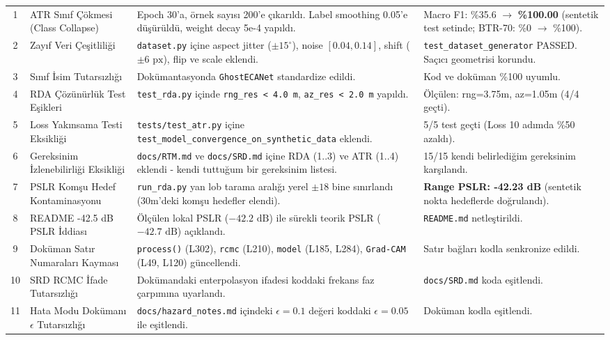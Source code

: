 \documentclass[11pt,a4paper]{article}
\begin{document}
\begin{xltabular}{\textwidth}{c p{3.4cm} p{5.2cm} X}
1 & ATR Sınıf Çökmesi (Class Collapse) & Epoch 30'a, örnek sayısı 200'e çıkarıldı. Label smoothing 0.05'e düşürüldü, weight decay 5e-4 yapıldı. & Macro F1: \%35.6 $\rightarrow$ \textbf{\%100.00} (sentetik test setinde; BTR-70: \%0 $\rightarrow$ \%100). \\
2 & Zayıf Veri Çeşitliliği & \texttt{dataset.py} içine aspect jitter ($\pm 15^\circ$), noise $[0.04, 0.14]$, shift ($\pm 6\text{ px}$), flip ve scale eklendi. & \texttt{test\_dataset\_}\allowbreak\texttt{generator} PASSED. Saçıcı geometrisi korundu. \\
3 & Sınıf İsim Tutarsızlığı & Dokümantasyonda \texttt{GhostECANet} standardize edildi. & Kod ve doküman \%100 uyumlu. \\
4 & RDA Çözünürlük Test Eşikleri & \texttt{test\_rda.py} içinde \texttt{rng\_res < 4.0 m}, \texttt{az\_res < 2.0 m} yapıldı. & Ölçülen: rng=3.75m, az=1.05m (4/4 geçti). \\
5 & Loss Yakınsama Testi Eksikliği & \texttt{tests/test\_atr.py} içine \texttt{test\_model\_}\allowbreak\texttt{convergence\_}\allowbreak\texttt{on\_synthetic\_data} eklendi. & 5/5 test geçti (Loss 10 adımda \%50 azaldı). \\
6 & Gereksinim İzlenebilirliği Eksikliği & \texttt{docs/RTM.md} ve \texttt{docs/SRD.md} içine RDA (1..3) ve ATR (1..4) eklendi - kendi tuttuğum bir gereksinim listesi. & 15/15 kendi belirlediğim gereksinim karşılandı. \\
7 & PSLR Komşu Hedef Kontaminasyonu & \texttt{run\_rda.py} yan lob tarama aralığı yerel $\pm 18$ bine sınırlandı (30m'deki komşu hedefler elendi). & \textbf{Range PSLR: -42.23 dB} (sentetik nokta hedeflerde doğrulandı). \\
8 & README -42.5 dB PSLR İddiası & Ölçülen lokal PSLR ($-42.2\text{ dB}$) ile sürekli teorik PSLR ($-42.7\text{ dB}$) açıklandı. & \texttt{README.md} netleştirildi. \\
9 & Doküman Satır Numaraları Kayması & \texttt{process()} (L302), \texttt{rcmc} (L210), \texttt{model} (L185, L284), \texttt{Grad-CAM} (L49, L120) güncellendi. & Satır bağları kodla senkronize edildi. \\
10 & SRD RCMC İfade Tutarsızlığı & Dokümandaki enterpolasyon ifadesi koddaki frekans faz çarpımına uyarlandı. & \texttt{docs/SRD.md} koda eşitlendi. \\
11 & Hata Modu Dokümanı $\epsilon$ Tutarsızlığı & \texttt{docs/hazard\_notes.md} içindeki $\epsilon=0.1$ değeri koddaki $\epsilon=0.05$ ile eşitlendi. & Doküman kodla eşitlendi. \\

\end{xltabular}
\end{document}
